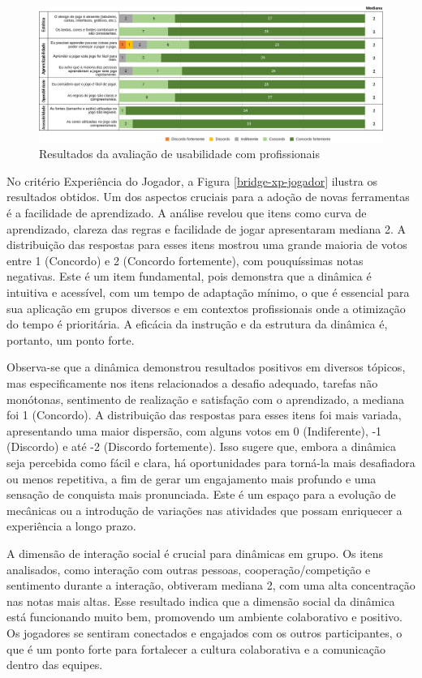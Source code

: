 \documentclass[
	12pt,
	openright,
	twoside,
	a4paper,
	english,
	brazil
	]{abntex2}
\begin{document}
\begin{figure}[H]
	\caption{\label{bridge-usabilidade} Resultados da avaliação de usabilidade com profissionais}
  \includegraphics[width=\textwidth]{bridge-usabilidade}
\end{figure}

No critério Experiência do Jogador, a Figura \ref{bridge-xp-jogador} ilustra os resultados obtidos. Um dos aspectos cruciais para a adoção de novas ferramentas é a facilidade de aprendizado. A análise revelou que itens como curva de aprendizado, clareza das regras e facilidade de jogar apresentaram mediana 2. A distribuição das respostas para esses itens mostrou uma grande maioria de votos entre 1 (Concordo) e 2 (Concordo fortemente), com pouquíssimas notas negativas. Este é um item fundamental, pois demonstra que a dinâmica é intuitiva e acessível, com um tempo de adaptação mínimo, o que é essencial para sua aplicação em grupos diversos e em contextos profissionais onde a otimização do tempo é prioritária. A eficácia da instrução e da estrutura da dinâmica é, portanto, um ponto forte.

Observa-se que a dinâmica demonstrou resultados positivos em diversos tópicos, mas especificamente nos itens relacionados a desafio adequado, tarefas não monótonas, sentimento de realização e satisfação com o aprendizado, a mediana foi 1 (Concordo). A distribuição das respostas para esses itens foi mais variada, apresentando uma maior dispersão, com alguns votos em 0 (Indiferente), -1 (Discordo) e até -2 (Discordo fortemente). Isso sugere que, embora a dinâmica seja percebida como fácil e clara, há oportunidades para torná-la mais desafiadora ou menos repetitiva, a fim de gerar um engajamento mais profundo e uma sensação de conquista mais pronunciada. Este é um espaço para a evolução de mecânicas ou a introdução de variações nas atividades que possam enriquecer a experiência a longo prazo.

A dimensão de interação social é crucial para dinâmicas em grupo. Os itens analisados, como interação com outras pessoas, cooperação/competição e sentimento durante a interação, obtiveram mediana 2, com uma alta concentração nas notas mais altas. Esse resultado indica que a dimensão social da dinâmica está funcionando muito bem, promovendo um ambiente colaborativo e positivo. Os jogadores se sentiram conectados e engajados com os outros participantes, o que é um ponto forte para fortalecer a cultura colaborativa e a comunicação dentro das equipes.
\end{document}
